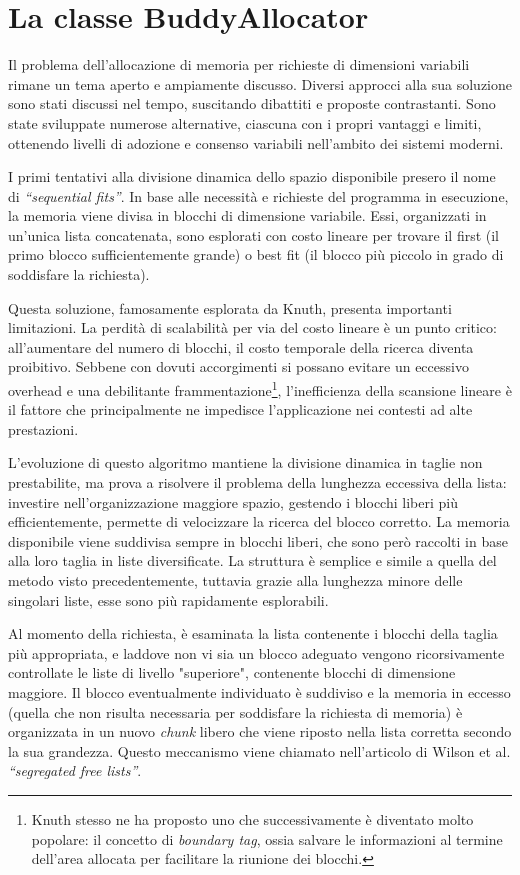 \section{La classe BuddyAllocator}
Il problema dell’allocazione di memoria per richieste di dimensioni variabili rimane un tema aperto e ampiamente discusso. Diversi approcci alla sua soluzione sono stati discussi nel tempo, suscitando dibattiti e proposte contrastanti. Sono state sviluppate numerose alternative, ciascuna con i propri vantaggi e limiti, ottenendo livelli di adozione e consenso variabili nell'ambito dei sistemi moderni.

I primi tentativi alla divisione dinamica dello spazio disponibile presero il nome di \textit{“sequential fits”}. In base alle necessità e richieste del programma in esecuzione, la memoria viene divisa in blocchi di dimensione variabile. Essi, organizzati in un'unica lista concatenata, sono esplorati con costo lineare per trovare il first (il primo blocco sufficientemente grande) o best fit (il blocco più piccolo in grado di soddisfare la richiesta).

Questa soluzione, famosamente esplorata da Knuth, presenta importanti limitazioni. La perdità di scalabilità per via del costo lineare è un punto critico: all’aumentare del numero di blocchi, il costo temporale della ricerca diventa proibitivo. Sebbene con dovuti accorgimenti si possano evitare un eccessivo overhead e una debilitante frammentazione\footnote{Knuth stesso ne ha proposto uno che successivamente è diventato molto popolare: il concetto di \textit{boundary tag}, ossia salvare le informazioni al termine dell'area allocata per facilitare la riunione dei blocchi.}, l’inefficienza della scansione lineare è il fattore che principalmente ne impedisce l'applicazione nei contesti ad alte prestazioni.

L’evoluzione di questo algoritmo mantiene la divisione dinamica in taglie non prestabilite, ma prova a risolvere il problema della lunghezza eccessiva della lista: investire nell’organizzazione maggiore spazio, gestendo i blocchi liberi più efficientemente, permette di velocizzare la ricerca del blocco corretto. La memoria disponibile viene suddivisa sempre in blocchi liberi, che sono però raccolti in base alla loro taglia in liste diversificate. La struttura è semplice e simile a quella del metodo visto precedentemente, tuttavia grazie alla lunghezza minore delle singolari liste, esse sono più rapidamente esplorabili.

Al momento della richiesta, è esaminata la lista contenente i blocchi della taglia più appropriata, e laddove non vi sia un blocco adeguato vengono ricorsivamente controllate le liste di livello "superiore", contenente blocchi di dimensione maggiore. Il blocco eventualmente individuato è suddiviso e la memoria in eccesso (quella che non risulta necessaria per soddisfare la richiesta di memoria) è organizzata in un nuovo \textit{chunk} libero che viene riposto nella lista corretta secondo la sua grandezza. Questo meccanismo viene chiamato nell’articolo di Wilson et al. \textit{“segregated free lists”}.

